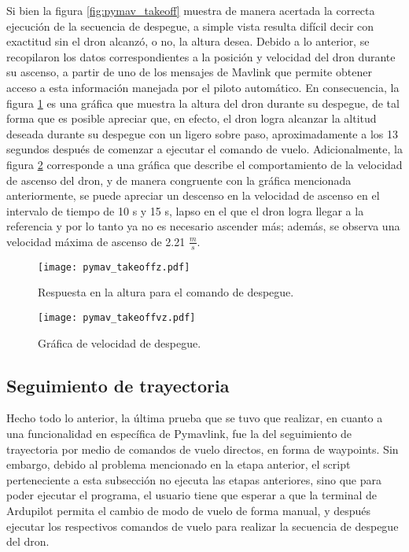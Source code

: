 Si bien la figura \ref{fig:pymav_takeoff} muestra de manera acertada la correcta ejecución de la secuencia de despegue, a simple vista resulta difícil decir con exactitud sin el dron alcanzó, o no, la altura desea. Debido a lo anterior, se recopilaron los datos correspondientes a la posición y velocidad del dron durante su ascenso, a partir de uno de los mensajes de Mavlink que permite obtener acceso a esta información manejada por el piloto automático. En consecuencia, la figura \ref{fig:pymav_takeoffz} es una gráfica que muestra la altura del dron durante su despegue, de tal forma que es posible apreciar que, en efecto, el dron logra alcanzar la altitud deseada durante su despegue con un ligero sobre paso, aproximadamente a los 13 segundos después de comenzar a ejecutar el comando de vuelo. Adicionalmente, la figura \ref{fig:pymav_takeoffvz} corresponde a una gráfica que describe el comportamiento de la velocidad de ascenso del dron, y de manera congruente con la gráfica mencionada anteriormente, se puede apreciar un descenso en la velocidad de ascenso en el intervalo de tiempo de 10 s y 15 s, lapso en el que el dron logra llegar a la referencia y por lo tanto ya no es necesario ascender más;  además, se observa una velocidad máxima de ascenso de 2.21 $\frac{m}{s}$.

\begin{figure}[ht]
    \centering
    \texttt{[image: pymav\_takeoffz.pdf]}
    \caption{Respuesta en la altura para el comando de despegue.}
    \label{fig:pymav_takeoffz}
\end{figure}

\begin{figure}[ht]
    \centering
    \texttt{[image: pymav\_takeoffvz.pdf]}
    \caption{Gráfica de velocidad de despegue.}
    \label{fig:pymav_takeoffvz}
\end{figure}

\newpage

\subsection{Seguimiento de trayectoria}

Hecho todo lo anterior, la última prueba que se tuvo que realizar, en cuanto a una funcionalidad en específica de Pymavlink, fue la del seguimiento de trayectoria por medio de comandos de vuelo directos, en forma de waypoints. Sin embargo, debido al problema mencionado en la etapa anterior, el script perteneciente a esta subsección no ejecuta las etapas anteriores, sino que para poder ejecutar el programa, el usuario tiene que esperar a que la terminal de Ardupilot permita el cambio de modo de vuelo de forma manual, y después ejecutar los respectivos comandos de vuelo para realizar la secuencia de despegue del dron.

